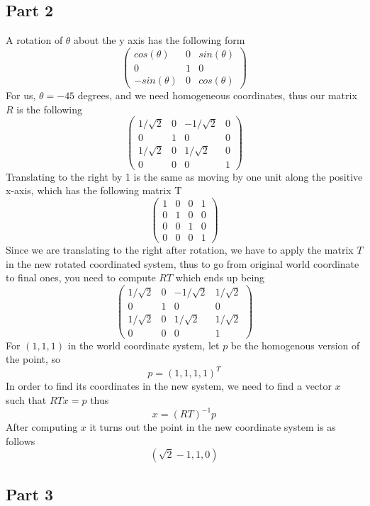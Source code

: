 \documentclass[11pt,psfig]{article}
\begin{document}
\newpage

\subsection*{Part 2}

A rotation of $\theta$ about the y axis has the following form
\[ \left( \begin{array}{ccc}
cos(\theta) & 0 & sin(\theta) \\
0 & 1 & 0 \\
-sin(\theta) & 0 & cos(\theta) \end{array} \right)\]
For us, $\theta=-45$ degrees, and we need homogeneous coordinates, thus our matrix $R$ is the following
\[ \left( \begin{array}{cccc}
1/\sqrt{2} & 0 & -1/\sqrt{2} & 0 \\
0 & 1 & 0 & 0\\
1/\sqrt{2} & 0 & 1/\sqrt{2} & 0 \\
0 & 0 & 0 & 1 \end{array} \right)\]
Translating to the right by 1 is the same as moving by one unit along the positive x-axis, which has the following matrix T 
\[ \left( \begin{array}{cccc}
1 & 0 & 0 & 1 \\
0 & 1 & 0 & 0\\
0 & 0 & 1 & 0 \\
0 & 0 & 0 & 1 \end{array} \right)\]
Since we are translating to the right after rotation, we have to apply the matrix $T$ in the new rotated coordinated system, thus to go from original world coordinate to final ones, you need to compute $RT$ which ends up being
\[ \left( \begin{array}{cccc}
1/\sqrt{2} & 0 & -1/\sqrt{2} & 1/\sqrt{2} \\
0 & 1 & 0 & 0\\
1/\sqrt{2} & 0 & 1/\sqrt{2} & 1/\sqrt{2} \\
0 & 0 & 0 & 1 \end{array} \right)\]
For $(1,1,1)$ in the world coordinate system, let $p$ be the homogenous version of the point, so 
\[
p=(1,1,1,1)^T
\]
In order to find its coordinates in the new system, we need to find a vector $x$ such that $RTx=p$ thus 
\[
x=(RT)^{-1} p
\] 
After computing $x$ it turns out the point in the new coordinate system is as follows
\[
(\sqrt{2} - 1, 1,0)
\]

\newpage

\subsection*{Part 3}
\end{document}
